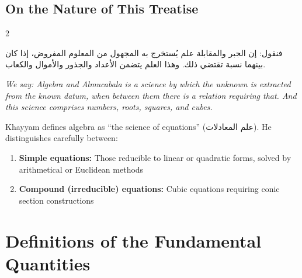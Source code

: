 \documentclass[11pt,a4paper]{book}
\begin{document}
\subsection{On the Nature of This Treatise}
\label{subsec:nature}

\begin{paracol}{2}

\begin{Arabic}
فنقول: إن الجبر والمقابلة علم يُستخرج به المجهول من المعلوم المفروض، إذا كان بينهما نسبة تقتضي ذلك. وهذا العلم يتضمن الأعداد والجذور والأموال والكعاب.
\end{Arabic}

\switchcolumn

\textit{We say: Algebra and Almucabala is a science by which the unknown is extracted from the known datum, when between them there is a relation requiring that. And this science comprises numbers, roots, squares, and cubes.}

\end{paracol}

Khayyam defines algebra as ``the science of equations'' (\textarabic{علم المعادلات}). He distinguishes carefully between:

\begin{enumerate}[noitemsep]
\item \textbf{Simple equations:} Those reducible to linear or quadratic forms, solved by arithmetical or Euclidean methods
\item \textbf{Compound (irreducible) equations:} Cubic equations requiring conic section constructions
\end{enumerate}

\clearpage
\section{Definitions of the Fundamental Quantities}
\label{sec:definitions}
\end{document}
